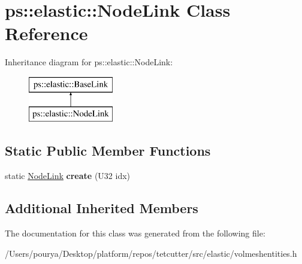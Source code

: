 \hypertarget{classps_1_1elastic_1_1NodeLink}{}\section{ps\+:\+:elastic\+:\+:Node\+Link Class Reference}
\label{classps_1_1elastic_1_1NodeLink}
Inheritance diagram for ps\+:\+:elastic\+:\+:Node\+Link\+:\begin{figure}[H]
\begin{center}
\leavevmode
\includegraphics[height=2.000000cm]{classps_1_1elastic_1_1NodeLink}
\end{center}
\end{figure}
\subsection*{Static Public Member Functions}
\begin{DoxyCompactItemize}
\item 
\hypertarget{classps_1_1elastic_1_1NodeLink_aec4721a2587ab7fa6aadd737358b6321}{}static \hyperlink{classps_1_1elastic_1_1NodeLink}{Node\+Link} {\bfseries create} (U32 idx)\label{classps_1_1elastic_1_1NodeLink_aec4721a2587ab7fa6aadd737358b6321}

\end{DoxyCompactItemize}
\subsection*{Additional Inherited Members}


The documentation for this class was generated from the following file\+:\begin{DoxyCompactItemize}
\item 
/\+Users/pourya/\+Desktop/platform/repos/tetcutter/src/elastic/volmeshentities.\+h\end{DoxyCompactItemize}
